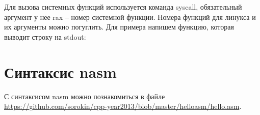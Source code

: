 \documentclass[a4paper,12pt]{article}
\begin{document}
Для вызова системных функций используется команда syscall,
обязательный аргумент у нее rax -- номер системной функции. Номера
функций для линукса и их аргументы можно погуглить. Для примера
напишем функцию, которая выводит строку на stdout:



\section{Синтаксис nasm}

С синтаксисом nasm можно познакомиться в файле \url{https://github.com/sorokin/cpp-year2013/blob/master/helloasm/hello.asm}.
\end{document}
